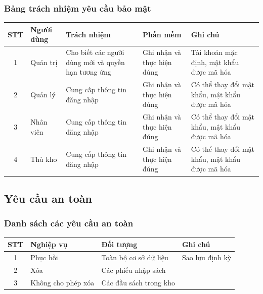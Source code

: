 \documentclass[12pt]{report}
\begin{document}
            \subsubsection{Bảng trách nhiệm yêu cầu bảo mật}
                \begin{tabularx}{\textwidth}{|c|l|>{\RaggedRight}X|>{\RaggedRight}X|>{\RaggedRight}X|}
                    \hline
                    \textbf{STT} & \textbf{Người dùng} & 
                    \textbf{Trách nhiệm} & \textbf{Phần mềm} & \textbf{Ghi chú} \\ \hline
                    1 & Quản trị & Cho biết các người dùng mới và quyền hạn tương ứng & Ghi nhận và thực hiện đúng & Tài khoản mặc định, mật khẩu được mã hóa \\ \hline
                    2 & Quản lý & Cung cấp thông tin đăng nhập & Ghi nhận và thực hiện đúng & Có thể thay đổi mật khẩu, mật khẩu được mã hóa \\ \hline
                    3 & Nhân viên & Cung cấp thông tin đăng nhập & Ghi nhận và thực hiện đúng & Có thể thay đổi mật khẩu, mật khẩu được mã hóa \\ \hline
                    4 & Thủ kho & Cung cấp thông tin đăng nhập & Ghi nhận và thực hiện đúng & Có thể thay đổi mật khẩu, mật khẩu được mã hóa \\ \hline
                \end{tabularx}
        \subsection{Yêu cầu an toàn}
            \subsubsection{Danh sách các yêu cầu an toàn}
                \begin{tabular}{|c|l|l|l|}
                    \hline
                    \textbf{STT} & \textbf{Nghiệp vụ} & 
                    \textbf{Đối tượng} & Ghi chú \\ \hline
                    1 & Phục hồi & Toàn bộ cơ sở dữ liệu & Sao lưu định kỳ \\ \hline
                    2 & Xóa & Các phiếu nhập sách & \\ \hline
                    3 & Không cho phép xóa & Các đầu sách trong kho & \\ \hline
                \end{tabular}
\end{document}
